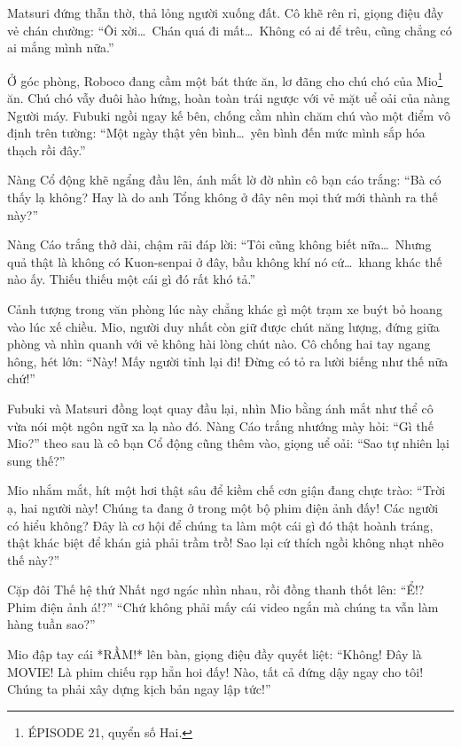 \documentclass[../main.tex]{subfiles}
\begin{document}

Matsuri đứng thẫn thờ, thả lỏng người xuống đất. Cô khẽ rên rỉ, giọng điệu đầy vẻ chán chường: ``Ôi xời\dots\ Chán quá đi mất\dots\ Không có ai để trêu, cũng chẳng có ai mắng mình nữa.''

Ở góc phòng, Roboco đang cầm một bát thức ăn, lơ đãng cho chú chó của Mio\footnote{{\flaregothic ÉPISODE 21}, quyển số Hai.} ăn. Chú chó vẫy đuôi hào hứng, hoàn toàn trái ngược với vẻ mặt uể oải của nàng Người máy. Fubuki ngồi ngay kế bên, chống cằm nhìn chăm chú vào một điểm vô định trên tường: ``Một ngày thật yên bình\dots\ yên bình đến mức mình sắp hóa thạch rồi đây.''

Nàng Cổ động khẽ ngẩng đầu lên, ánh mắt lờ đờ nhìn cô bạn cáo trắng: ``Bà có thấy lạ không? Hay là do anh Tổng không ở đây nên mọi thứ mới thành ra thế này?''

Nàng Cáo trắng thở dài, chậm rãi đáp lời: ``Tôi cũng không biết nữa\dots\ Nhưng quả thật là không có Kuon-senpai ở đây, bầu không khí nó cứ\dots\ khang khác thế nào ấy. Thiếu thiếu một cái gì đó rất khó tả.''

Cảnh tượng trong văn phòng lúc này chẳng khác gì một trạm xe buýt bỏ hoang vào lúc xế chiều. Mio, người duy nhất còn giữ được chút năng lượng, đứng giữa phòng và nhìn quanh với vẻ không hài lòng chút nào. Cô chống hai tay ngang hông, hét lớn: ``Này! Mấy người tỉnh lại đi! Đừng có tỏ ra lười biếng như thế nữa chứ!''


Fubuki và Matsuri đồng loạt quay đầu lại, nhìn Mio bằng ánh mắt như thể cô vừa nói một ngôn ngữ xa lạ nào đó. Nàng Cáo trắng nhướng mày hỏi: ``Gì thế Mio?'' theo sau là cô bạn Cổ động cũng thêm vào, giọng uể oải: ``Sao tự nhiên lại sung thế?''

Mio nhắm mắt, hít một hơi thật sâu để kiềm chế cơn giận đang chực trào: ``Trời ạ, hai người này! Chúng ta đang ở trong một bộ phim điện ảnh đấy! Các người có hiểu không? Đây là cơ hội để chúng ta làm một cái gì đó thật hoành tráng, thật khác biệt để khán giả phải trầm trồ! Sao lại cứ thích ngồi không nhạt nhẽo thế này?''

Cặp đôi Thế hệ thứ Nhất ngơ ngác nhìn nhau, rồi đồng thanh thốt lên: ``Ể!? Phim điện ảnh á!?'' ``Chứ không phải mấy cái video ngắn mà chúng ta vẫn làm hàng tuần sao?''

Mio đập tay cái *RẦM!* lên bàn, giọng điệu đầy quyết liệt: ``Không! Đây là MOVIE! Là phim chiếu rạp hẳn hoi đấy! Nào, tất cả đứng dậy ngay cho tôi! Chúng ta phải xây dựng kịch bản ngay lập tức!''
\end{document}
